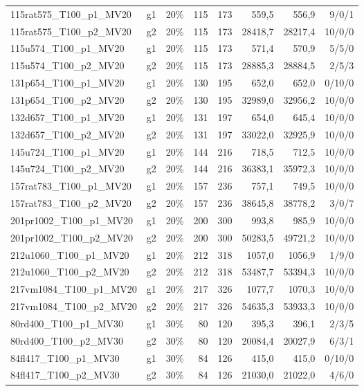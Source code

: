 \begin{longtable}{llrrrrrr}
115rat575\_T100\_p1\_MV20 & g1 & 20\% & 115 & 173 & 559{,}5 & 556{,}9 & 9/0/1 \\
115rat575\_T100\_p2\_MV20 & g2 & 20\% & 115 & 173 & 28418{,}7 & 28217{,}4 & 10/0/0 \\
115u574\_T100\_p1\_MV20 & g1 & 20\% & 115 & 173 & 571{,}4 & 570{,}9 & 5/5/0 \\
115u574\_T100\_p2\_MV20 & g2 & 20\% & 115 & 173 & 28885{,}3 & 28884{,}5 & 2/5/3 \\
131p654\_T100\_p1\_MV20 & g1 & 20\% & 130 & 195 & 652{,}0 & 652{,}0 & 0/10/0 \\
131p654\_T100\_p2\_MV20 & g2 & 20\% & 130 & 195 & 32989{,}0 & 32956{,}2 & 10/0/0 \\
132d657\_T100\_p1\_MV20 & g1 & 20\% & 131 & 197 & 654{,}0 & 645{,}4 & 10/0/0 \\
132d657\_T100\_p2\_MV20 & g2 & 20\% & 131 & 197 & 33022{,}0 & 32925{,}9 & 10/0/0 \\
145u724\_T100\_p1\_MV20 & g1 & 20\% & 144 & 216 & 718{,}5 & 712{,}5 & 10/0/0 \\
145u724\_T100\_p2\_MV20 & g2 & 20\% & 144 & 216 & 36383{,}1 & 35972{,}3 & 10/0/0 \\
157rat783\_T100\_p1\_MV20 & g1 & 20\% & 157 & 236 & 757{,}1 & 749{,}5 & 10/0/0 \\
157rat783\_T100\_p2\_MV20 & g2 & 20\% & 157 & 236 & 38645{,}8 & 38778{,}2 & 3/0/7 \\
201pr1002\_T100\_p1\_MV20 & g1 & 20\% & 200 & 300 & 993{,}8 & 985{,}9 & 10/0/0 \\
201pr1002\_T100\_p2\_MV20 & g2 & 20\% & 200 & 300 & 50283{,}5 & 49721{,}2 & 10/0/0 \\
212u1060\_T100\_p1\_MV20 & g1 & 20\% & 212 & 318 & 1057{,}0 & 1056{,}9 & 1/9/0 \\
212u1060\_T100\_p2\_MV20 & g2 & 20\% & 212 & 318 & 53487{,}7 & 53394{,}3 & 10/0/0 \\
217vm1084\_T100\_p1\_MV20 & g1 & 20\% & 217 & 326 & 1077{,}7 & 1070{,}3 & 10/0/0 \\
217vm1084\_T100\_p2\_MV20 & g2 & 20\% & 217 & 326 & 54635{,}3 & 53933{,}3 & 10/0/0 \\
80rd400\_T100\_p1\_MV30 & g1 & 30\% & 80 & 120 & 395{,}3 & 396{,}1 & 2/3/5 \\
80rd400\_T100\_p2\_MV30 & g2 & 30\% & 80 & 120 & 20084{,}4 & 20027{,}9 & 6/3/1 \\
84fl417\_T100\_p1\_MV30 & g1 & 30\% & 84 & 126 & 415{,}0 & 415{,}0 & 0/10/0 \\
84fl417\_T100\_p2\_MV30 & g2 & 30\% & 84 & 126 & 21030{,}0 & 21022{,}0 & 4/6/0 \\

\end{longtable}
